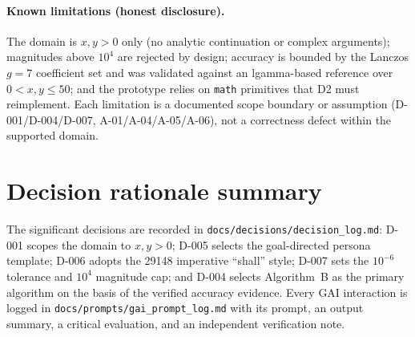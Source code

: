 \documentclass[11pt,a4paper]{article}
\begin{document}
\paragraph{Known limitations (honest disclosure).} The domain is $x,y>0$ only (no analytic
continuation or complex arguments); magnitudes above $10^4$ are rejected by design;
accuracy is bounded by the Lanczos $g=7$ coefficient set and was validated against an
lgamma-based reference over $0<x,y\le 50$; and the prototype relies on \texttt{math}
primitives that D2 must reimplement. Each limitation is a documented scope boundary or
assumption (D-001/D-004/D-007, A-01/A-04/A-05/A-06), not a correctness defect within the
supported domain.

\section{Decision rationale summary}
The significant decisions are recorded in \texttt{docs/decisions/decision\_log.md}:
D-001 scopes the domain to $x,y>0$; D-005 selects the goal-directed persona template;
D-006 adopts the 29148 imperative ``shall'' style; D-007 sets the $10^{-6}$ tolerance and
$10^4$ magnitude cap; and D-004 selects Algorithm~B as the primary algorithm on the basis
of the verified accuracy evidence. Every GAI interaction is logged in
\texttt{docs/prompts/gai\_prompt\_log.md} with its prompt, an output summary, a critical
evaluation, and an independent verification note.



\end{document}
